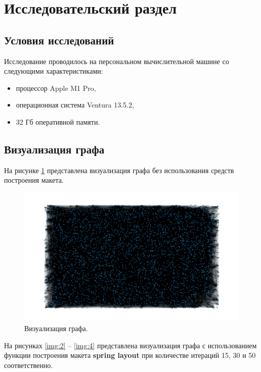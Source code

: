 \section{Исследовательский раздел}
\subsection{Условия исследований}
Исследование проводилось на персональном вычислительной машине со следующими характеристиками:

\begin{itemize}
\item процессор Apple M1 Pro,
\item операционная система Ventura 13.5.2,
\item 32 Гб оперативной памяти.
\end{itemize}

\subsection{Визуализация графа}

На рисунке \ref{img:1} представлена визуализация графа без использования средств построения макета.

\begin{figure}[H]
	\centering
	\includegraphics[width=\textwidth]{inc/1.png}
	\caption{ Визуализация графа.}
	\label{img:1}
\end{figure}

На рисунках \ref{img:2} -- \ref{img:4} представлена визуализация графа с использованием функции построения макета \textbf{spring layout} при количестве итераций 15, 30 и 50 соответственно.

